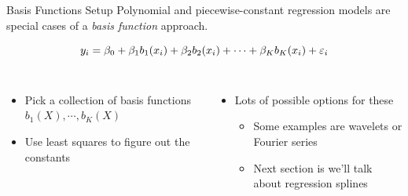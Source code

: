 \documentclass[aspectratio=169,usenames,dvipsnames]{beamer}
\newcommand{\InstructorList}[1]{
\begin{itemize}
	\color{orange}
	#1
\end{itemize}
}
\begin{document}
\begin{frame}[t]{Basis Functions Setup}
Polynomial and piecewise-constant regression models are special cases of a \textit{basis function} approach.

\begin{equation*}
	y_i = \beta_0 + \beta_1b_1(x_i) + \beta_2 b_2(x_i) + \cdots + \beta_K b_K(x_i) + \varepsilon_i
\end{equation*}

\begin{columns}
\centering
\InstructorList{
  \item Pick a collection of basis functions $b_1(X),\cdots,b_K(X)$
	\item Use least squares to figure out the constants

}

\centering

\InstructorList{
	\item Lots of possible options for these
	\InstructorList{
	  \item Some examples are wavelets or Fourier series
		\item Next section is we'll talk about regression splines
	}
}


\end{columns}

\end{frame}
\end{document}
